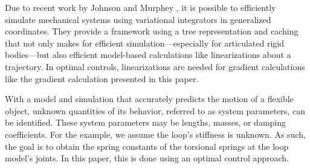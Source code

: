 \documentclass[letterpaper, 10pt, conference]{ieeeconf}
\begin{document}
Due to recent work by Johnson and Murphey \cite{johnson_murphey_scalable, johnson_murphey_linearization}, it is possible to efficiently simulate mechanical systems using variational integrators in generalized coordinates. They provide a framework using a tree representation and caching that not only makes for efficient simulation---especially for articulated rigid bodies---but also efficient model-based calculations like linearizations about a trajectory.   In optimal controls, linearizations are needed for gradient calculations like the gradient calculation presented in this paper.  %

With a model and simulation that accurately predicts the motion of a flexible object, unknown quantities of its behavior, referred to as system parameters, can be identified.  These system parameters may be lengths, masses, or damping coefficients.  For the example, we assume the loop's stiffness is unknown.  As such, the goal is to obtain the spring constants of the torsional springs at the loop model's joints.  In this paper, this is done using an optimal control approach.






\end{document}
